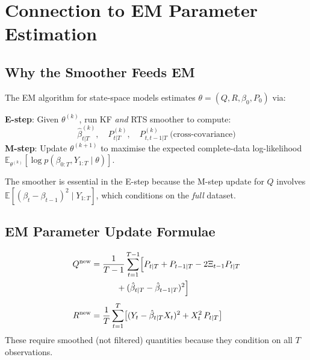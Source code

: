 \documentclass[10pt,a4paper,twocolumn]{article}
\begin{document}
\section{Connection to EM Parameter Estimation}

\subsection{Why the Smoother Feeds EM}

The EM algorithm for state-space models estimates
$\theta = (Q, R, \beta_0, P_0)$ via:

\begin{tcolorbox}[notebox={EM for State-Space (Shumway--Stoffer)}]
\textbf{E-step}: Given $\theta^{(k)}$, run KF \emph{and} RTS
smoother to compute:
\[
  \hat\beta_{t|T}^{(k)},\quad
  P_{t|T}^{(k)},\quad
  P_{t,t-1|T}^{(k)} \;\text{(cross-covariance)}
\]
\textbf{M-step}: Update $\theta^{(k+1)}$ to maximise the
expected complete-data log-likelihood
$\mathbb{E}_{\theta^{(k)}}[\log p(\beta_{0:T}, Y_{1:T} \mid \theta)]$.
\end{tcolorbox}

\noindent The smoother is essential in the E-step because the M-step
update for $Q$ involves $\mathbb{E}[(\beta_t-\beta_{t-1})^2 \mid Y_{1:T}]$,
which conditions on the \emph{full} dataset.

\subsection{EM Parameter Update Formulae}

\begin{tcolorbox}[mathbox={EM Updates from Smoothed States}]
\vspace{-4pt}
\begin{align}
  Q^{\text{new}} &= \frac{1}{T-1}\sum_{t=1}^{T-1}
    \Bigl[P_{t|T} + P_{t-1|T}
    - 2\Xi_{t-1}P_{t|T} \nonumber\\
  &\qquad\quad + (\hat\beta_{t|T}-\hat\beta_{t-1|T})^2\Bigr]
    \label{eq:Q_em}\\[4pt]
  R^{\text{new}} &= \frac{1}{T}\sum_{t=1}^{T}
    \bigl[(Y_t - \hat\beta_{t|T}X_t)^2
    + X_t^2\,P_{t|T}\bigr]
    \label{eq:R_em}
\end{align}
\vspace{-4pt}
These require smoothed (not filtered) quantities because they
condition on all $T$ observations.
\end{tcolorbox}
\end{document}
